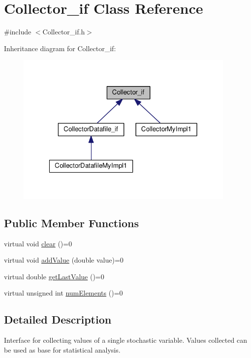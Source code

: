 \hypertarget{class_collector__if}{\section{Collector\-\_\-if Class Reference}
\label{class_collector__if}
}


{\ttfamily \#include $<$Collector\-\_\-if.\-h$>$}



Inheritance diagram for Collector\-\_\-if\-:\nopagebreak
\begin{figure}[H]
\begin{center}
\leavevmode
\includegraphics[width=304pt]{class_collector__if__inherit__graph}
\end{center}
\end{figure}
\subsection*{Public Member Functions}
\begin{DoxyCompactItemize}
\item 
virtual void \hyperlink{class_collector__if_a035bd1300c85866870c2f6178a9528e8}{clear} ()=0
\item 
virtual void \hyperlink{class_collector__if_ac7b83bce8ddb4903d247c1eddd656171}{add\-Value} (double value)=0
\item 
virtual double \hyperlink{class_collector__if_aa14f7e1065af8fd38ab592e224fb7e43}{get\-Last\-Value} ()=0
\item 
virtual unsigned int \hyperlink{class_collector__if_a75c20c68c54089105ca8c440997a7cca}{num\-Elements} ()=0
\end{DoxyCompactItemize}


\subsection{Detailed Description}
Interface for collecting values of a single stochastic variable. Values collected can be used as base for statistical analysis. 

